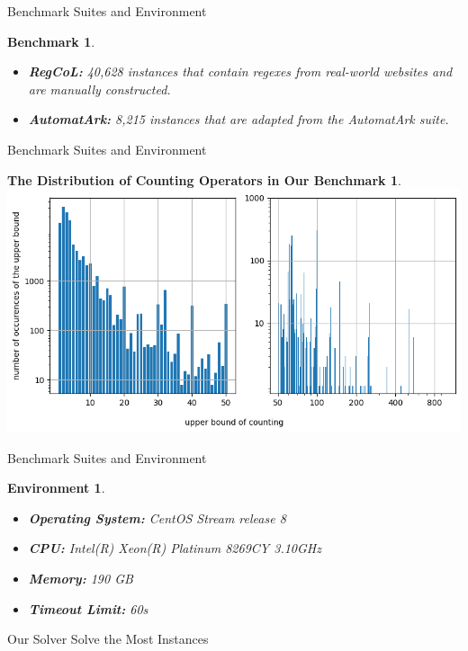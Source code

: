 \documentclass[landscape]{beamer}
\newtheorem{benchmark}{Benchmark}
\newtheorem{environment}{Environment}
\newtheorem{distribution}{The Distribution of Counting Operators in Our Benchmark}
\begin{document}
\begin{frame}{Benchmark Suites and Environment}
  \begin{benchmark}
    \begin{itemize}
      \item \textbf{RegCoL:} 40,628 instances that contain regexes from real-world websites and are manually constructed.
      \item \textbf{AutomatArk:}  8,215 instances that are adapted from the AutomatArk suite.
    \end{itemize}
  \end{benchmark}
\end{frame}

\begin{frame}{Benchmark Suites and Environment}
  \begin{distribution}
    \includegraphics[width=\linewidth]{counting_distribution.png}
  \end{distribution}
\end{frame}

\begin{frame}{Benchmark Suites and Environment}
  \begin{environment}
    \begin{itemize}
      \item \textbf{Operating System: } CentOS Stream release 8
      \item \textbf{CPU: } Intel(R) Xeon(R) Platinum 8269CY 3.10GHz
      \item \textbf{Memory: } 190 GB
      \item \textbf{Timeout Limit: } 60s
    \end{itemize}
  \end{environment}
\end{frame}

\begin{frame}{Our Solver Solve the Most Instances}
  \centering
  
\end{frame}
\end{document}
